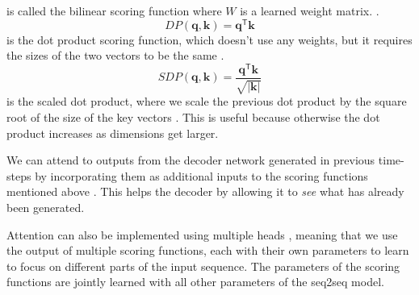 \documentclass[12pt]{article}
\begin{document}
is called the bilinear scoring function where \(W\) is a learned weight matrix. \cite{Luong:2015}.
\begin{equation}
DP(\bm{q},\bm{k})=\bm{q}^\mathsf{T}\bm{k}
\end{equation}
is the dot product scoring function, which doesn't use any weights, but it requires the sizes of the two vectors to be the same \cite{Luong:2015}.
\begin{equation}
SDP(\bm{q},\bm{k})=\frac{\bm{q}^\mathsf{T}\bm{k}}{\sqrt{|\bm{k}|}}
\end{equation}
is the scaled dot product, where we scale the previous dot product by the square root of the size of the key vectors \cite{Vaswani:2017}. This is useful because otherwise the dot product increases as dimensions get larger.

We can attend to outputs from the decoder network generated in previous time-steps by incorporating them as additional inputs to the scoring functions mentioned above \cite{Shao:2017}. This helps the decoder by allowing it to \textit{see} what has already been generated.

Attention can also be implemented using multiple heads \cite{Vaswani:2017}, meaning that we use the output of multiple scoring functions, each with their own parameters to learn to focus on different parts of the input sequence. The parameters of the scoring functions are jointly learned with all other parameters of the seq2seq model.
\end{document}
